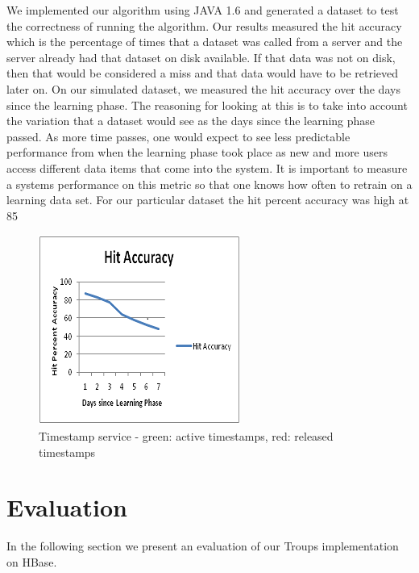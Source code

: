 \documentclass[10pt,final,journal]{IEEEtran}
\begin{document}
We implemented our algorithm using JAVA 1.6 and generated a dataset to test the correctness of running the algorithm. Our results measured the hit accuracy which is the percentage of times that a dataset was called from a server and the server already had that dataset on disk available. If that data was not on disk, then that would be considered a miss and that data would have to be retrieved later on. On our simulated dataset, we measured the hit accuracy over the days since the learning phase. The reasoning for looking at this is to take into account the variation that a dataset would see as the days since the learning phase passed. As more time passes, one would expect to see less predictable performance from when the learning phase took place as new and more users access different data items that come into the system. It is important to measure a systems performance on this metric so that one knows how often to retrain on a learning data set. For our particular dataset the hit percent accuracy was high at 85%

\begin{figure}[!t]
\centering
\hspace*{-.2in}
\includegraphics{images/hitaccuracy.png}
\caption{Timestamp service - green: active timestamps, red: released timestamps}
\label{ts}
\end{figure}

\section{Evaluation}
In the following section we present an evaluation of our Troups implementation on HBase.
\end{document}
